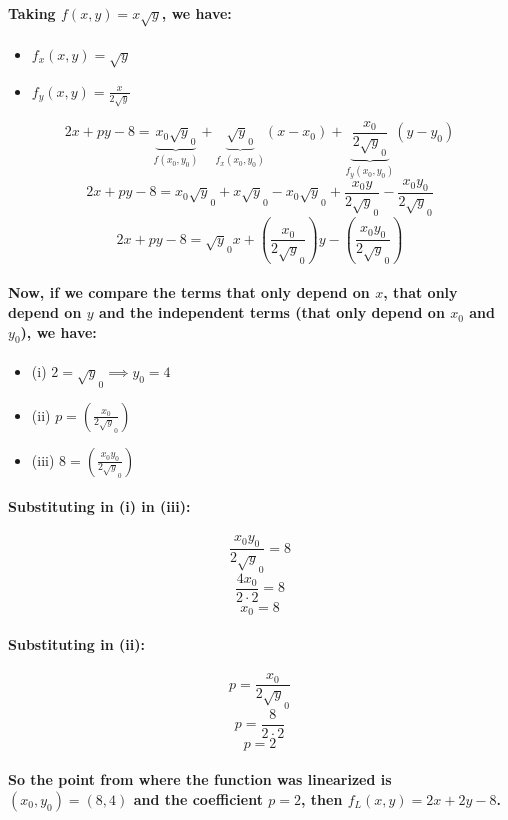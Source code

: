 \documentclass[a4paper]{article}    %
\begin{document}
\paragraph{Taking $f(x,y) = x\sqrt y$, we have:}
\begin{itemize}
    \item $f_x(x,y) = \sqrt y$
    \item $f_y(x,y) = \frac{x}{2\sqrt y}$
\end{itemize}
    \[2x+py-8 = \underbrace{x_0\sqrt y_0}_{f(x_0,y_0)} + \underbrace{\sqrt y_0}_{f_x(x_0,y_0)}(x-x_0) + \underbrace{\frac{x_0}{2\sqrt y_0}}_{f_y(x_0,y_0)}(y-y_0)\]
    \[2x+py-8 = x_0\sqrt y_0 + x\sqrt y_0 - x_0\sqrt y_0 + \frac{x_0 y}{2\sqrt y_0} - \frac{x_0 y_0}{2\sqrt y_0}\]
    \[2x+py-8 =  \sqrt y_0 x + \left(\frac{x_0}{2\sqrt y_0}\right) y - \left(\frac{x_0 y_0}{2\sqrt y_0}\right)\]
    
    \paragraph{Now, if we compare the terms that only depend on $x$, that only depend on $y$ and the independent terms (that only depend on $x_0$ and $y_0$), we have:}
\begin{itemize}
    \item (i)   $ 2 = \sqrt y_0 \implies \boxed{y_0 = 4}$ 
    \item (ii)  $ p = \left(\frac{x_0}{2\sqrt y_0}\right) $
    \item (iii) $ 8 = \left(\frac{x_0 y_0}{2\sqrt y_0}\right) $
\end{itemize}

\paragraph{Substituting in (i) in (iii):}
    \[\frac{x_0 y_0}{2\sqrt y_0} = 8\]
    \[\frac{4 x_0}{2\cdot2} = 8\]
    \[\boxed{x_0 = 8}\]

\paragraph{Substituting in (ii):}
    \[p = \frac{x_0}{2\sqrt y_0}\]
    \[p = \frac{8}{2\cdot2}\]
    \[\boxed{p = 2}\]

    \paragraph{So the point from where the function was linearized is $(x_0,y_0) = (8,4)$ and the coefficient $p = 2$, then $f_L(x,y) = 2x + 2y -8$.}
\end{document}
